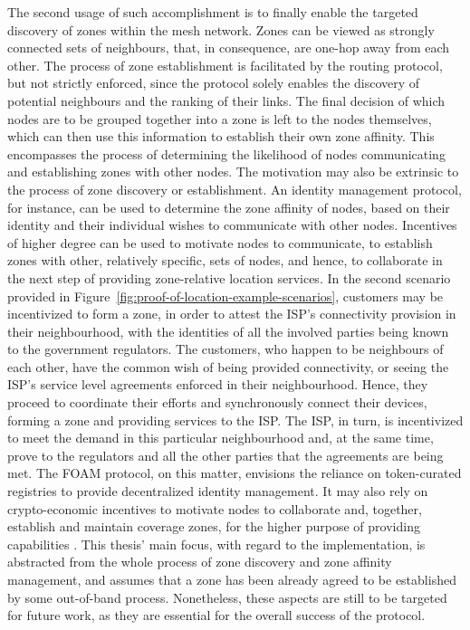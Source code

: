 The second usage of such accomplishment is to finally enable the targeted discovery of zones within the mesh network. Zones can be viewed as strongly connected sets of neighbours, that, in consequence, are one-hop away from each other. The process of zone establishment is facilitated by the routing protocol, but not strictly enforced, since the protocol solely enables the discovery of potential neighbours and the ranking of their links. The final decision of which nodes are to be grouped together into a zone is left to the nodes themselves, which can then use this information to establish their own zone affinity. This encompasses the process of determining the likelihood of nodes communicating and establishing zones with other nodes. The motivation may also be extrinsic to the process of zone discovery or establishment. An identity management protocol, for instance, can be used to determine the zone affinity of nodes, based on their identity and their individual wishes to communicate with other nodes. Incentives of higher degree can be used to motivate nodes to communicate, to establish zones with other, relatively specific, sets of nodes, and hence, to collaborate in the next step of providing zone-relative location services. In the second scenario provided in Figure~\ref{fig:proof-of-location-example-scenarios}, customers may be incentivized to form a zone, in order to attest the ISP's connectivity provision in their neighbourhood, with the identities of all the involved parties being known to the government regulators. The customers, who happen to be neighbours of each other, have the common wish of being provided connectivity, or seeing the ISP's service level agreements enforced in their neighbourhood. Hence, they proceed to coordinate their efforts and synchronously connect their devices, forming a zone and providing \pol{} services to the ISP. The ISP, in turn, is incentivized to meet the demand in this particular neighbourhood and, at the same time, prove to the regulators and all the other parties that the agreements are being met. The FOAM protocol, on this matter, envisions the reliance on token-curated registries to provide decentralized identity management. It may also rely on crypto-economic incentives to motivate nodes to collaborate and, together, establish and maintain coverage zones, for the higher purpose of providing \pol{} capabilities \cite{foam-white-paper}. This thesis' main focus, with regard to the \poc{} implementation, is abstracted from the whole process of zone discovery and zone affinity management, and assumes that a zone has been already agreed to be established by some out-of-band process. Nonetheless, these aspects are still to be targeted for future work, as they are essential for the overall success of the protocol.

